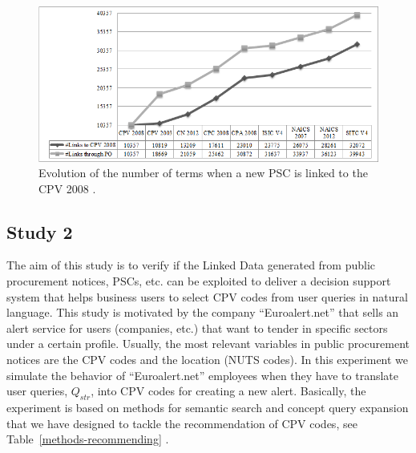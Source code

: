  \begin{figure}[!ht]
\centering
	\includegraphics[width=\textwidth]{./imgs/fig-3}
 \caption{Evolution of the number of terms when a new PSC is linked to the CPV 2008 .}
 \label{fig:results-3}
\end{figure}


\subsection{Study 2}
The aim of this study is to verify if the Linked Data generated from public procurement notices, PSCs, etc. can be exploited to deliver a decision 
support system that helps business users to select CPV codes from user queries in natural language. This study is motivated by the company ``Euroalert.net'' 
that sells an alert service for users (companies, etc.) that want to tender in specific sectors under a certain profile. 
Usually, the most relevant variables in public procurement notices are the CPV codes and the location (NUTS codes). In this experiment 
we simulate the behavior of ``Euroalert.net'' employees when they have to translate user queries, $Q_{str}$, into CPV codes for creating a new alert. 
Basically, the experiment is based on methods for semantic search and concept query expansion that we have designed to 
tackle the recommendation of CPV codes, see Table~\ref{methods-recommending} . 

